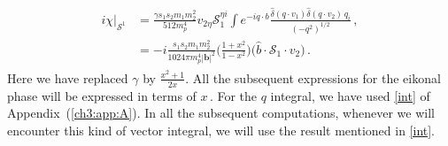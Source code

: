 \begin{align}
    \begin{split} 
      i  \chi\Big|_{\mathcal{S}^1}&= \frac{\gamma s_1 s_2 m_1 m_2^2}{512 m _p^4}v_{2\eta}\mathcal{S}_1^{\eta i}\int e^{-iq\cdot b}\frac{\hat\delta(q\cdot v_1)\hat\delta(q\cdot v_2)\, q_i}{(-q^2)^{1/2}}\,,\\ &
        =-i\frac{ s_1 s_2 m_1 m_2^2}{1024 \pi m _p^4|\boldsymbol{b}|^2}\Big(\frac{1+x^2}{1-x^2}\Big)\Big(\hat b\cdot \mathcal{S}_1\cdot v_2\Big)\,.
        \end{split}
\end{align}
Here we have replaced $\gamma$ by $\frac{x^2+1}{2 x}.$ All the subsequent expressions for the eikonal phase will be expressed in terms of $x\,.$ For the $q$ integral, we have used \eqref{int} of Appendix~(\ref{ch3:app:A}). In all the subsequent computations, whenever we will encounter this kind of vector integral, we will use the result mentioned in \eqref{int}.

